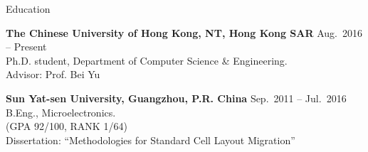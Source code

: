 

\begin{rSection}{Education}

{\bf The Chinese University of Hong Kong, NT, Hong Kong SAR} \hfill { Aug.~2016 -- Present}\\
Ph.D. student, Department of Computer Science \& Engineering. \\
Advisor: Prof. Bei Yu

{\bf Sun Yat-sen University, Guangzhou, P.R. China} \hfill { Sep.~2011 -- Jul.~2016}\\
B.Eng., Microelectronics.\\
(GPA 92/100, RANK 1/64) \\
Dissertation: ``Methodologies for Standard Cell Layout Migration''
\end{rSection}

